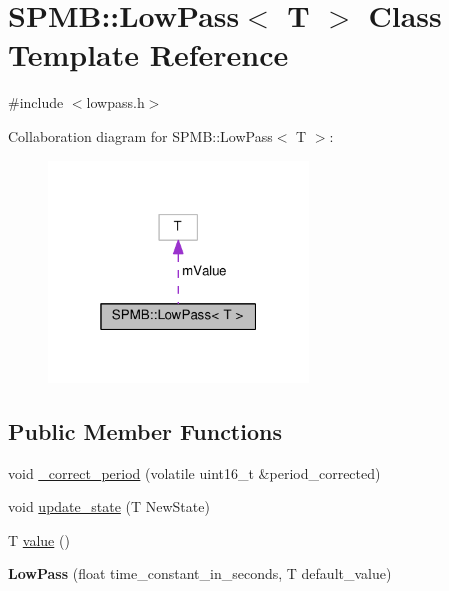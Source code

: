 \hypertarget{classSPMB_1_1LowPass}{}\section{S\+P\+MB\+:\+:Low\+Pass$<$ T $>$ Class Template Reference}
\label{classSPMB_1_1LowPass}


{\ttfamily \#include $<$lowpass.\+h$>$}



Collaboration diagram for S\+P\+MB\+:\+:Low\+Pass$<$ T $>$\+:
\nopagebreak
\begin{figure}[H]
\begin{center}
\leavevmode
\includegraphics[width=196pt]{classSPMB_1_1LowPass__coll__graph}
\end{center}
\end{figure}
\subsection*{Public Member Functions}
\begin{DoxyCompactItemize}
\item 
void \hyperlink{classSPMB_1_1LowPass_a11696a906cb869ccf580673b8ddfee3b}{\+\_\+correct\+\_\+period} (volatile uint16\+\_\+t \&period\+\_\+corrected)
\item 
void \hyperlink{classSPMB_1_1LowPass_ac01c87236e0a4974e0fe63c648ad0a7e}{update\+\_\+state} (T New\+State)
\item 
T \hyperlink{classSPMB_1_1LowPass_a5f21ff8ce24fcbd7296edd991b425556}{value} ()
\item 
{\bfseries Low\+Pass} (float time\+\_\+constant\+\_\+in\+\_\+seconds, T default\+\_\+value)\hypertarget{classSPMB_1_1LowPass_a763169e42d8a7059a77a6fda0ae98f24}{}\label{classSPMB_1_1LowPass_a763169e42d8a7059a77a6fda0ae98f24}

\end{DoxyCompactItemize}
